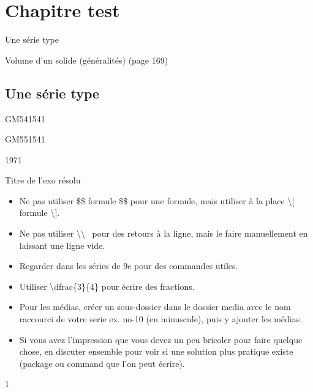 \documentclass[a4paper,11pt]{report}
\begin{document}
\newcommand{\chapterName}{Chapitre test}
\newcommand{\serieName}{Une série type}

\chapter*{\chapterName}
\thispagestyle{empty}

\begin{amL}{\serieName}{
\item Volume d'un solide (généralités) (page 169)
}\end{amL}

\section*{\serieName}
\setcounter{page}{1}


\begin{exol}{GM54}{154}{1}
\end{exol}
\begin{exof}{GM55}{154}{1}
\end{exof}

\begin{QSJ}{197}{1}
\end{QSJ}

\begin{resolu}{Titre de l'exo résolu}{
		\begin{itemize}
			\item Ne pas utiliser \$\$ formule \$\$ pour une formule, mais 
utiliser à la place \textbackslash[ formule \textbackslash].
\item Ne pas utiliser \textbackslash\textbackslash~  pour des retours à la ligne, mais le faire manuellement en laissant une ligne vide.
\item Regarder dans les séries de 9e pour des commandes utiles.
\item Utiliser \textbackslash dfrac\{3\}\{4\} pour écrire des fractions.
\item Pour les médias, créer un sous-dossier dans le dossier media avec le nom raccourci de votre serie ex. no-10 (en minuscule), puis y ajouter les médias. 
\item Si vous avez l'impression que vous devez un peu bricoler pour faire quelque chose, en discuter ensemble pour voir si une solution plus pratique existe (package ou command que l'on peut écrire).
\end{itemize}
}{1}
\end{resolu}
\end{document}
